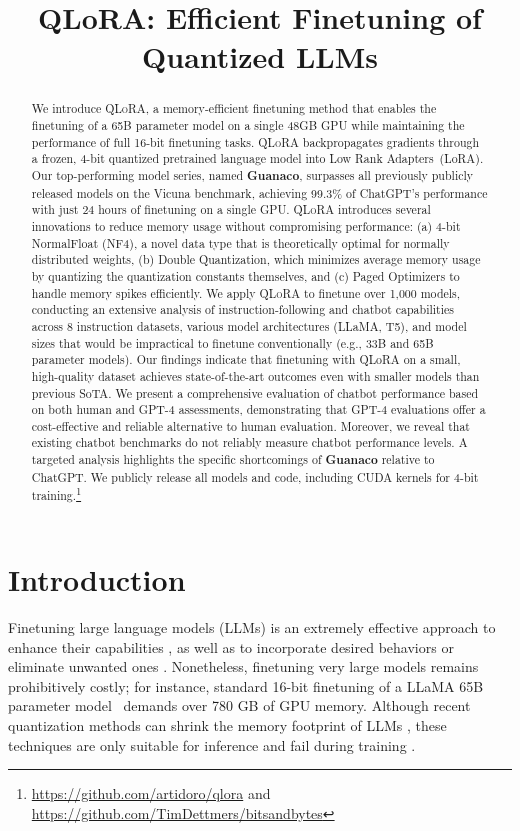 \title{QLoRA: Efficient Finetuning of Quantized LLMs}

\begin{abstract}
We introduce \textsc{QLoRA}, a memory-efficient finetuning method that enables the finetuning of a 65B parameter model on a single 48GB GPU while maintaining the performance of full 16-bit finetuning tasks. \textsc{QLoRA} backpropagates gradients through a frozen, 4-bit quantized pretrained language model into Low Rank Adapters~(LoRA). Our top-performing model series, named \textbf{Guanaco}, surpasses all previously publicly released models on the Vicuna benchmark, achieving 99.3\% of ChatGPT’s performance with just 24 hours of finetuning on a single GPU. \textsc{QLoRA} introduces several innovations to reduce memory usage without compromising performance: (a) 4-bit NormalFloat (NF4), a novel data type that is theoretically optimal for normally distributed weights, (b) Double Quantization, which minimizes average memory usage by quantizing the quantization constants themselves, and (c) Paged Optimizers to handle memory spikes efficiently. We apply \textsc{QLoRA} to finetune over 1,000 models, conducting an extensive analysis of instruction-following and chatbot capabilities across 8 instruction datasets, various model architectures (LLaMA, T5), and model sizes that would be impractical to finetune conventionally (e.g., 33B and 65B parameter models). Our findings indicate that finetuning with QLoRA on a small, high-quality dataset achieves state-of-the-art outcomes even with smaller models than previous SoTA. We present a comprehensive evaluation of chatbot performance based on both human and GPT-4 assessments, demonstrating that GPT-4 evaluations offer a cost-effective and reliable alternative to human evaluation. Moreover, we reveal that existing chatbot benchmarks do not reliably measure chatbot performance levels. A targeted analysis highlights the specific shortcomings of \textbf{Guanaco} relative to ChatGPT. We publicly release all models and code, including CUDA kernels for 4-bit training.\footnote{\url{https://github.com/artidoro/qlora} and \url{https://github.com/TimDettmers/bitsandbytes}}
\end{abstract}

\section{Introduction}

Finetuning large language models (LLMs) is an extremely effective approach to enhance their capabilities \citep{min2021metaicl, wei2021finetuned, ouyang2022training, wang2022super, wang2022self, liu2022few}, as well as to incorporate desired behaviors or eliminate unwanted ones \citep{ouyang2022training, askell2021general, bai2022training}. Nonetheless, finetuning very large models remains prohibitively costly; for instance, standard 16-bit finetuning of a LLaMA 65B parameter model~\citep{touvron2023llama} demands over 780 GB of GPU memory. Although recent quantization methods can shrink the memory footprint of LLMs \citep{dettmers2022llm, dettmers2022case, frantar2022gptq, xiao2022smoothquant}, these techniques are only suitable for inference and fail during training \citep{wortsman2023stable}. 

